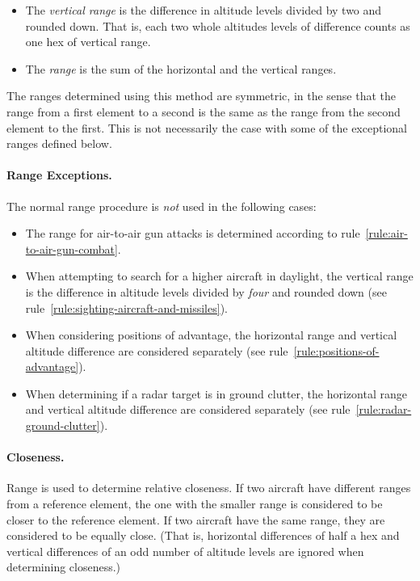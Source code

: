 {\begin{itemize}
Figure~\ref{figure:range-example} gives examples of horizontal ranges.

\item
The \emph{vertical range} is the difference in altitude levels divided by two and rounded down. That is, each two whole altitudes levels of difference counts as one hex of vertical range.
\item
The \emph{range} is the sum of the horizontal and the vertical ranges.
\end{itemize}

The ranges determined using this method are symmetric, in the sense that the range from a first element to a second is the same as the range from the second element to the first. This is not necessarily the case with some of the exceptional ranges defined below.

\paragraph{Range Exceptions.}
The normal range procedure is \emph{not} used in the following cases:
\begin{itemize}

\item
The range for air-to-air gun attacks is determined according to rule~\ref{rule:air-to-air-gun-combat}.

\item
When attempting to search for a higher aircraft in daylight, the vertical range is the difference in altitude levels divided by \emph{four} and rounded down (see rule~\ref{rule:sighting-aircraft-and-missiles}).

\item
When considering positions of advantage, the horizontal range and vertical altitude difference are considered separately (see rule~\ref{rule:positions-of-advantage}).

\item
When determining if a radar target is in ground clutter, the horizontal range and vertical altitude difference are considered separately (see rule~\ref{rule:radar-ground-clutter}).

\end{itemize}

\paragraph{Closeness.}
\label{rule:closeness}

Range is used to determine relative closeness. If two aircraft have different ranges from a reference element, the one with the smaller range is considered to be closer to the reference element. If two aircraft have the same range, they are considered to be equally close. (That is, horizontal differences of half a hex and vertical differences of an odd number of altitude levels are ignored when determining closeness.)

}
